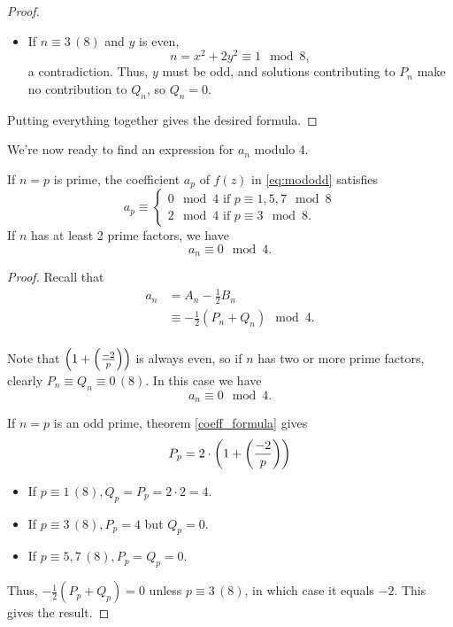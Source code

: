 \documentclass[12pt, a4paper]{report}
\begin{document}
\begin{proof}
\begin{itemize}
  \item If $n \equiv 3 \, (8)$ and $y$ is even,
    \[n = x^2 + 2y^2 \equiv 1 \mod{8},\] a contradiction. Thus, $y$ must be odd,
    and solutions contributing to $P_n$ make no contribution to $Q_n$, so $Q_n =
    0$.
  \end{itemize}
  Putting everything together gives the desired formula.

\end{proof}

We're now ready to find an expression for $a_n$ modulo 4. 

\begin{thm} \label{theta_calculation}
  If $n = p$ is prime, the coefficient $a_p$ of $f(z)$ in \autoref{eq:mododd}
  satisfies
  \[a_p \equiv \begin{cases}
      0 \mod{4} \text{ if } p \equiv 1,5,7 \mod{8} \\
      2 \mod{4} \text{ if } p \equiv 3 \mod{8}.
    \end{cases}\]
  If $n$ has at least 2 prime factors, we have
  \[a_n \equiv 0 \mod{4}.\]
\end{thm}
\begin{proof}
  Recall that
  \[
    \begin{split}
      a_n &= A_n - \frac{1}{2}B_n \\
      &\equiv -\frac{1}{2}(P_n + Q_n) \mod{4}. \\
    \end{split}
  \]

  Note that $\left( 1 + \left(\frac{-2}{p}\right) \right)$ is always even, so
  if $n$ has two or more prime factors, clearly $P_n \equiv Q_n \equiv 0 \,(8)$.
  In this case we have
  \[a_n\equiv 0 \mod{4}.\]

  If $n = p$ is an odd prime, theorem \autoref{coeff_formula} gives
  \[P_p = 2 \cdot \left( 1 + \left(\frac{-2}{p}\right) \right)\]
  \begin{itemize}
  \item If $p \equiv 1 \, (8), Q_p = P_p = 2 \cdot 2 = 4$.

  \item If $p \equiv 3 \, (8), P_p = 4$ but $Q_p = 0$.

  \item If $p \equiv 5, 7 \, (8), P_p = Q_p = 0$.
  \end{itemize}
  Thus, $-\frac{1}{2} (P_p + Q_p) = 0$ unless $p \equiv 3 \, (8)$, in which case
  it equals $-2$. This gives the result.

\end{proof}
\end{document}
